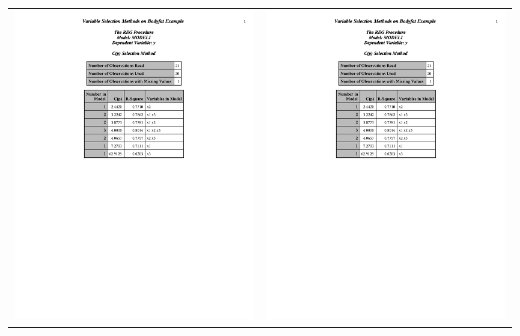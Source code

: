 \documentclass{article}
\begin{document}
\begin{center}
\begin{tabular}{cc}
\includegraphics[page=3,scale=0.6,trim=40mm 30mm 20mm 10mm]{bodyfatexampleselection}&
\includegraphics[page=4,scale=0.6,trim=40mm 30mm 20mm 10mm]{bodyfatexampleselection}\\

\end{tabular}
\end{center}
\end{document}
